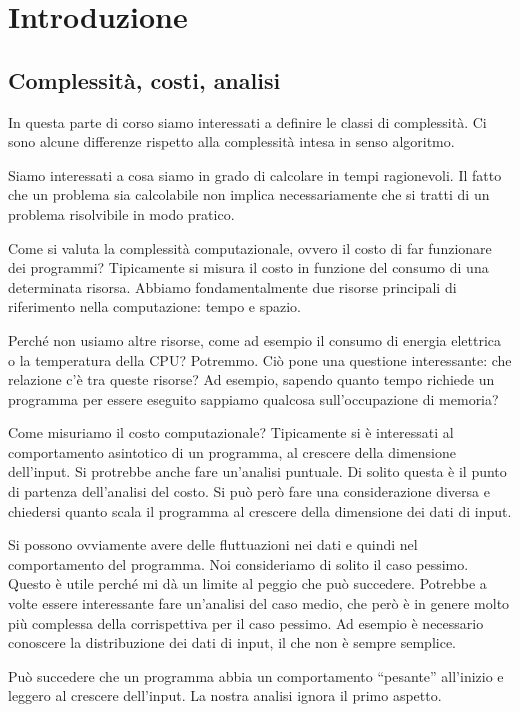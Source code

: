 \chapter{Introduzione}

\section{Complessità, costi, analisi}

In questa parte di corso siamo interessati a definire le classi di complessità. Ci sono alcune
differenze rispetto alla complessità intesa in senso algoritmo.

Siamo interessati a cosa siamo in grado di calcolare in tempi ragionevoli. Il fatto che un problema
sia calcolabile non implica necessariamente che si tratti di un problema risolvibile in modo
pratico.

Come si valuta la complessità computazionale, ovvero il costo di far funzionare dei programmi?
Tipicamente si misura il costo in funzione del consumo di una determinata risorsa. Abbiamo
fondamentalmente due risorse principali di riferimento nella computazione: tempo e spazio.

Perché non usiamo altre risorse, come ad esempio il consumo di energia elettrica o la temperatura
della CPU? Potremmo. Ciò pone una questione interessante: che relazione c'è tra queste risorse? Ad
esempio, sapendo quanto tempo richiede un programma per essere eseguito sappiamo qualcosa
sull'occupazione di memoria?%

Come misuriamo il costo computazionale? Tipicamente si è interessati al comportamento asintotico di
un programma, al crescere della dimensione dell'input. Si protrebbe anche fare un'analisi puntuale.
Di solito questa è il punto di partenza dell'analisi del costo. Si può però fare una considerazione
diversa e chiedersi quanto scala il programma al crescere della dimensione dei dati di input.

Si possono ovviamente avere delle fluttuazioni nei dati e quindi nel comportamento del programma.
Noi consideriamo di solito il caso pessimo. Questo è utile perché mi dà un limite al peggio che
può succedere. Potrebbe a volte essere interessante fare un'analisi del caso medio, che però è in
genere molto più complessa della corrispettiva per il caso pessimo. Ad esempio è necessario
conoscere la distribuzione dei dati di input, il che non è sempre semplice.

Può succedere che un programma abbia un comportamento ``pesante'' all'inizio e leggero al crescere
dell'input. La nostra analisi ignora il primo aspetto.

